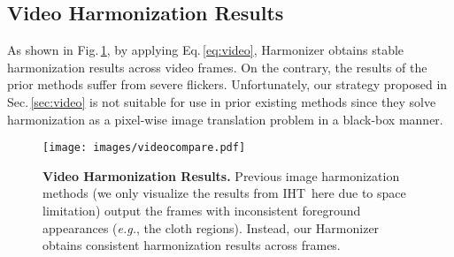 \documentclass[runningheads]{llncs}
\begin{document}
\subsection{Video Harmonization Results}\label{sec:4_2}

As shown in Fig.\,\ref{fig:video}, by applying Eq.\,\ref{eq:video}, 
Harmonizer obtains stable harmonization results across video frames.
On the contrary, the results of the prior methods suffer from severe flickers. Unfortunately, our strategy proposed in Sec.\,\ref{sec:video} is not suitable for use in prior existing methods since they solve harmonization as a pixel-wise image translation problem in a black-box manner. 




 \begin{figure}[t]
\centering
\texttt{[image: images/videocompare.pdf]}
{\begin{center}
\vspace{-0.5cm}
\caption{\textbf{Video Harmonization Results.} Previous image harmonization methods (we only visualize the results from IHT\,\cite{TransformerIH} here due to space limitation) output the frames with inconsistent foreground appearances ({\it e.g.}, the cloth regions). Instead, our Harmonizer obtains consistent harmonization results across frames.
}
\label{fig:video}
\end{center}
}
\vspace{-0.5cm}
\end{figure}
\end{document}
